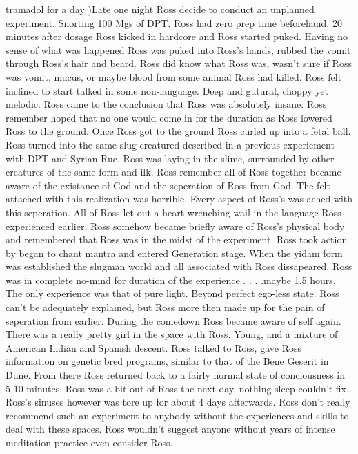 \documentclass[12pt]{book}
\begin{document}
tramadol for a day )Late one night Ross decide to conduct an unplanned experiment. Snorting 100 Mgs of DPT. Ross had zero prep time beforehand. 20 minutes after dosage Ross kicked in hardcore and Ross started puked. Having no sense of what was happened Ross was puked into Ross's hands, rubbed the vomit through Ross's hair and beard. Ross did know what Ross was, wasn't sure if Ross was vomit, mucus, or maybe blood from some animal Ross had killed. Ross felt inclined to start talked in some non-language. Deep and gutural, choppy yet melodic. Ross came to the conclusion that Ross was absolutely insane. Ross remember hoped that no one would come in for the duration as Ross lowered Ross to the ground. Once Ross got to the ground Ross curled up into a fetal ball. Ross turned into the same slug creatured described in a previous experiement with DPT and Syrian Rue. Ross was laying in the slime, surrounded by other creatures of the same form and ilk. Ross remember all of Ross together became aware of the existance of God and the seperation of Ross from God. The felt attached with this realization was horrible. Every aspect of Ross's was ached with this seperation. All of Ross let out a heart wrenching wail in the language Ross experienced earlier. Ross somehow became briefly aware of Ross's physical body and remembered that Ross was in the midst of the experiment. Ross took action by began to chant mantra and entered Generation stage. When the yidam form was established the slugman world and all associated with Ross dissapeared. Ross was in complete no-mind for duration of the experience . . .  .maybe 1.5 hours. The only experience was that of pure light. Beyond perfect ego-less state. Ross can't be adequately explained, but Ross more then made up for the pain of seperation from earlier. During the comedown Ross became aware of self again. There was a really pretty girl in the space with Ross. Young, and a mixture of American Indian and Spanish descent. Ross talked to Ross, gave Ross information on genetic bred programs, similar to that of the Bene Geserit in Dune. From there Ross returned back to a fairly normal state of conciousness in 5-10 minutes. Ross was a bit out of Ross the next day, nothing sleep couldn't fix. Ross's sinuses however was tore up for about 4 days afterwards. Ross don't really recommend such an experiment to anybody without the experiences and skills to deal with these spaces. Ross wouldn't suggest anyone without years of intense meditation practice even consider Ross.
\end{document}
